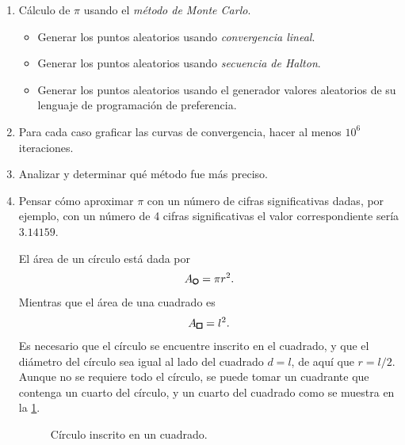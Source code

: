 \begin{enumerate}
    \item Cálculo de $\pi$ usando el \textit{método de Monte Carlo}.
    \begin{itemize}
        \item Generar los puntos aleatorios usando \textit{convergencia lineal}.
        \item Generar los puntos aleatorios usando \textit{secuencia de Halton}.
        \item Generar los puntos aleatorios usando el generador valores aleatorios de su lenguaje de programación de preferencia.
    \end{itemize}

    \item Para cada caso graficar las curvas de convergencia, hacer al menos $10^6$ iteraciones.
    \item Analizar y determinar qué método fue más preciso.
    \item Pensar cómo aproximar $\pi$ con un número de cifras significativas dadas, por ejemplo, con un número de 4 cifras significativas el valor correspondiente sería $3.14159$.
    \begin{solution}
        El área de un círculo está dada por
        \begin{equation*}
            A_{\circlefig} = \pi r^2 .
        \end{equation*}
        Mientras que el área de una cuadrado es
        \begin{equation*}
            A_{\squarefig} = l^2 .
        \end{equation*}
        Es necesario que el círculo se encuentre inscrito en el cuadrado, y que el diámetro del círculo sea igual al lado del cuadrado $d = l$, de aquí que $r = l/2$. Aunque no se requiere todo el círculo, se puede tomar un cuadrante que contenga un cuarto del círculo, y un cuarto del cuadrado como se muestra en la \cref{fig:relacion_cuadrado_circulo}.

        \begin{figure}[ht!]
            \centering
            \caption{Círculo inscrito en un cuadrado.}
            \label{fig:relacion_cuadrado_circulo}
        \end{figure}


\end{solution}
\end{enumerate}
